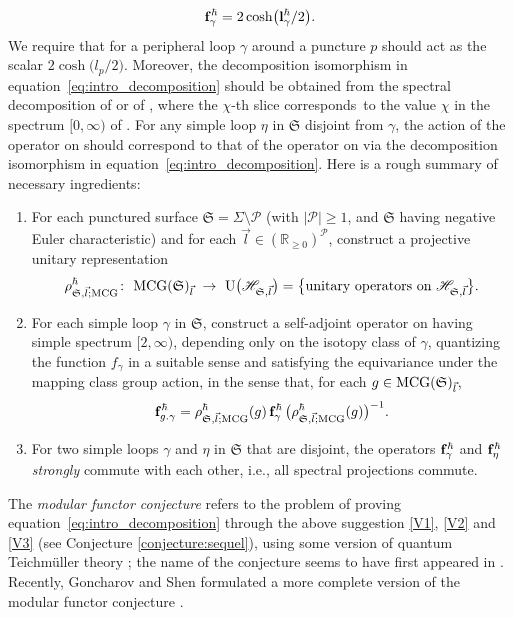 \documentclass[pdftex]{sigma}
\numberwithin{equation}{section}
\theoremstyle{definition}
\begin{document}
\[
{\bf f}^\hbar_\gamma = 2\cosh\bigl({\bf l}^\hbar_\gamma/2\bigr).
\]
We require that  for a peripheral loop $\gamma$ around a puncture $p$ should act as the scalar $2\cosh\bigl(l_p/2\bigr)$. Moreover, the decomposition isomorphism in equation~\eqref{eq:intro_decomposition} should be obtained from the spectral decomposition of  or of , where the $\chi$-th slice  corresponds~to the value $\chi$ in the spectrum $[0,\infty)$ of . For any simple loop $\eta$ in $\mathfrak{S}$ disjoint from $\gamma$, the action of the operator  on  should correspond to that of the operator  on  via the decomposition isomorphism in equation~\eqref{eq:intro_decomposition}. Here is a rough summary of necessary ingredients:
\begin{enumerate}[label={\rm (V\arabic*)}]\itemsep=0pt
\item\label{V1} For each punctured surface $\mathfrak{S} = \Sigma\setminus\mathcal{P}$ (with $|\mathcal{P}|\ge 1$, and $\mathfrak{S}$ having negative Euler characteristic) and for each $\vec{l} \in (\mathbb{R}_{\ge 0})^\mathcal{P}$, construct a projective unitary representation
\[
\rho^\hbar_{\mathfrak{S},\vec{l};{\rm MCG}}\colon \ {\rm MCG}(\mathfrak{S})_{\vec{l}} ~\to~ {\rm U}\bigl(\mathscr{H}_{\mathfrak{S},\vec{l}}\bigr) = \bigl\{\mbox{unitary operators on $\mathscr{H}_{\mathfrak{S},\vec{l}}$}\bigr\}.
\]
\item\label{V2} For each simple loop $\gamma$ in $\mathfrak{S}$, construct a self-adjoint operator  on  having simple spectrum $[2,\infty)$, depending only on the isotopy class of $\gamma$, quantizing the function $f_\gamma$ in a suitable sense and satisfying the equivariance under the mapping class group action, in the sense that, for each $g \in {\rm MCG}(\mathfrak{S})_{\vec{l}}$,
\[
{\bf f}^\hbar_{g.\gamma} = \rho^\hbar_{\mathfrak{S},\vec{l};{\rm MCG}}(g) \, {\bf f}^\hbar_{\gamma} \, \bigl(\rho^\hbar_{\mathfrak{S},\vec{l};{\rm MCG}}(g)\bigr)^{-1}.
\]
\item\label{V3} For two simple loops $\gamma$ and $\eta$ in $\mathfrak{S}$ that are disjoint, the operators ${\bf f}^\hbar_\gamma$ and ${\bf f}^\hbar_\eta$ {\em strongly} commute with each other, i.e., all spectral projections commute.
\end{enumerate}
The {\em modular functor conjecture} refers to the problem of proving equation~\eqref{eq:intro_decomposition} through the above suggestion \ref{V1}, \ref{V2} and \ref{V3} (see Conjecture \ref{conjecture:sequel}), using some version of quantum Teichm\"uller theory \cite{F97, FG09, Ian, T, Verlinde}; the name of the conjecture seems to have first appeared in \cite{F97}. Recently, Goncharov and Shen formulated a more complete version of the modular functor conjecture \cite{GS19}.
\end{document}
